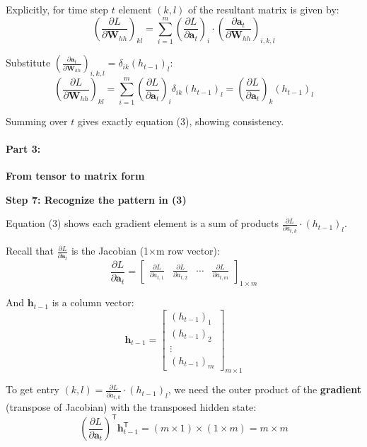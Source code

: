 \begin{notechapter}
Explicitly, for time step $t$ element $(k,l)$ of the resultant matrix is given
by:
\[
\left(\frac{\partial L}{\partial \mathbf{W}_{hh}}\right)_{kl} = 
\sum_{i=1}^m \left(\frac{\partial L}{\partial \mathbf{a}_t}\right)_i 
\cdot \left(\frac{\partial \mathbf{a}_t}{\partial \mathbf{W}_{hh}}\right)_{i,k,l}
\]

Substitute $\left(\frac{\partial \mathbf{a}_t}{\partial
\mathbf{W}_{hh}}\right)_{i,k,l} = \delta_{ik} (h_{t-1})_l$:
\[
\left(\frac{\partial L}{\partial \mathbf{W}_{hh}}\right)_{kl} = 
\sum_{i=1}^m \left(\frac{\partial L}{\partial \mathbf{a}_t}\right)_i \delta_{ik} (h_{t-1})_l
= \left(\frac{\partial L}{\partial \mathbf{a}_t}\right)_k (h_{t-1})_l
\]

Summing over $t$ gives exactly equation (3), showing consistency.

\paragraph{Part 3:}\textbf{From tensor to matrix form}

\vspace{1em}
\textbf{Step 7: Recognize the pattern in (3)}
\vspace{1em}

Equation (3) shows each gradient element is a sum of products $\frac{\partial
L}{\partial a_{t,k}} \cdot (h_{t-1})_l$.

Recall that $\frac{\partial L}{\partial \mathbf{a}_t}$ is the Jacobian (1×m row
vector):
\[
\frac{\partial L}{\partial \mathbf{a}_t} = 
\begin{bmatrix}
\frac{\partial L}{\partial a_{t,1}} &
\frac{\partial L}{\partial a_{t,2}} &
\cdots &
\frac{\partial L}{\partial a_{t,m}}
\end{bmatrix}_{1 \times m}
\]

And $\mathbf{h}_{t-1}$ is a column vector:
\[
\mathbf{h}_{t-1} =
\begin{bmatrix} (h_{t-1})_1 \\ (h_{t-1})_2 \\ \vdots \\ (h_{t-1})_m \end{bmatrix}_{m \times 1}
\]

To get entry $(k,l) = \frac{\partial L}{\partial a_{t,k}} \cdot (h_{t-1})_l$, we
need the outer product of the \textbf{gradient} (transpose of Jacobian) with the
transposed hidden state:
\[
\left(\frac{\partial L}{\partial \mathbf{a}_t}\right)^\mathsf{T} \mathbf{h}_{t-1}^\mathsf{T}
= (m \times 1) \times (1 \times m) = m \times m
\]


\end{notechapter}
